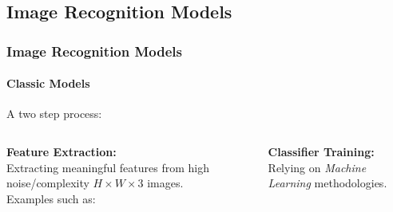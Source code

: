 \subsection*{Image Recognition Models}
\begin{frame}[t]
    \frametitle{Image Recognition Models}
    \framesubtitle{Classic Models}
    A two step process:\pause 
    \vspace{10pt}
    \begin{columns}
        \textbf{Feature Extraction:}\\
        Extracting meaningful features from high noise/complexity $H\times W\times 3$ images.\\
        Examples such as:
        \pause
        \textbf{Classifier Training:}\\
        Relying on \emph{Machine Learning} methodologies.
    \end{columns}
\end{frame}
